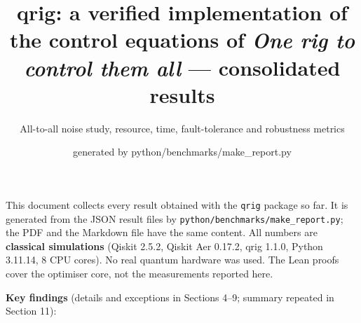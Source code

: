 \documentclass[
  10pt,
]{article}
\title{qrig: a verified implementation of the control equations of
\emph{One rig to control them all} --- consolidated results}
\subtitle{All-to-all noise study, resource, time, fault-tolerance and
robustness metrics}
\author{}
\date{generated by python/benchmarks/make\_report.py}
\begin{document}
\maketitle

{
\setcounter{tocdepth}{3}
\tableofcontents
}
This document collects every result obtained with the \texttt{qrig}
package so far. It is generated from the JSON result files by
\texttt{python/benchmarks/make\_report.py}; the PDF and the Markdown
file have the same content. All numbers are \textbf{classical
simulations} (Qiskit 2.5.2, Qiskit Aer 0.17.2, qrig 1.1.0, Python
3.11.14, 8 CPU cores). No real quantum hardware was used. The Lean
proofs cover the optimiser core, not the measurements reported here.

\textbf{Key findings} (details and exceptions in Sections 4--9; summary
repeated in Section 11):
\end{document}
